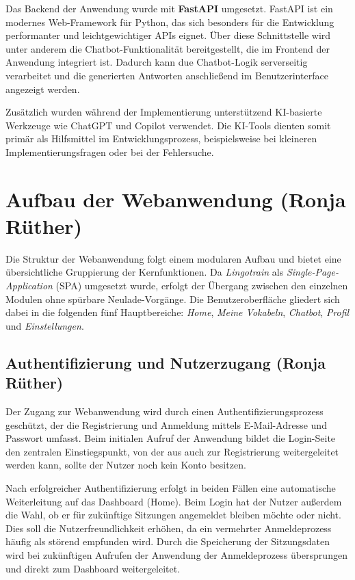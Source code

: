 Das Backend der Anwendung wurde mit \textbf{FastAPI} umgesetzt.
FastAPI ist ein modernes Web-Framework für Python, das sich besonders für die Entwicklung performanter und leichtgewichtiger APIs eignet.
Über diese Schnittstelle wird unter anderem die Chatbot-Funktionalität bereitgestellt, die im Frontend der Anwendung integriert ist.
Dadurch kann due Chatbot-Logik serverseitig verarbeitet und die generierten Antworten anschließend im Benutzerinterface angezeigt werden. \parencite{FastAPI}

Zusätzlich wurden während der Implementierung unterstützend KI-basierte Werkzeuge wie ChatGPT und Copilot verwendet.
Die KI-Tools dienten somit primär als Hilfsmittel im Entwicklungsprozess, beispielsweise bei kleineren Implementierungsfragen oder bei der Fehlersuche.

\section{Aufbau der Webanwendung (Ronja Rüther)}
Die Struktur der Webanwendung folgt einem modularen Aufbau und bietet eine übersichtliche
Gruppierung der Kernfunktionen. Da \textit{Lingotrain} als \textit{Single-Page-Application} (SPA) umgesetzt
wurde, erfolgt der Übergang zwischen den einzelnen Modulen ohne spürbare Neulade-Vorgänge. 
Die Benutzeroberfläche gliedert sich dabei in die folgenden fünf Hauptbereiche: \textit{Home}, 
\textit{Meine Vokabeln}, \textit{Chatbot}, \textit{Profil} und \textit{Einstellungen}.

\subsection{Authentifizierung und Nutzerzugang (Ronja Rüther)}
Der Zugang zur Webanwendung wird durch einen Authentifizierungsprozess geschützt, der die Registrierung und
Anmeldung mittels E-Mail-Adresse und Passwort umfasst. Beim initialen Aufruf der Anwendung bildet die 
Login-Seite den zentralen Einstiegspunkt, von der aus auch zur Registrierung weitergeleitet werden kann, 
sollte der Nutzer noch kein Konto besitzen.

Nach erfolgreicher Authentifizierung erfolgt in beiden Fällen eine automatische Weiterleitung auf das Dashboard (Home).
Beim Login hat der Nutzer außerdem die Wahl, ob er für zukünftige Sitzungen angemeldet bleiben möchte oder 
nicht. Dies soll die Nutzerfreundlichkeit erhöhen, da ein vermehrter Anmeldeprozess häufig als störend empfunden wird.
Durch die Speicherung der Sitzungsdaten wird bei zukünftigen Aufrufen der Anwendung der Anmeldeprozess übersprungen und
direkt zum Dashboard weitergeleitet.

